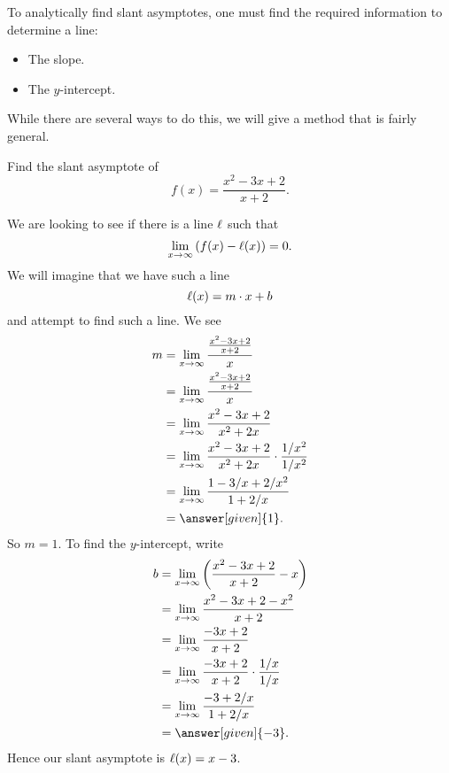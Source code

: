 \documentclass{ximera}
\begin{document}
To analytically find slant asymptotes, one must find the required
information to determine a line:
\begin{itemize}
\item The slope.
\item The $y$-intercept.
\end{itemize}
While there are several ways to do this, we will give a method that is
fairly general.


\begin{example}
  Find the slant asymptote of
  \[
f(x) = \frac{x^2-3x+2}{x+2}.
  \]
  \begin{explanation}
    We are looking to see if there is a line $\ell$ such that
    \[
    \lim_{x\to \infty}\left(f(x) - \l(x)\right) = 0.
    \]
    We will imagine that we have such a line
    \[
    \ell(x) = m\cdot x + b
    \]
    and attempt to find such a line. We see
    \begin{align*}
      m &=\lim_{x\to\infty}\frac{\frac{x^2-3x+2}{x+2}}{x}\\
      &= \lim_{x\to\infty}\frac{\frac{x^2-3x+2}{x+2}}{x}\\
      &= \lim_{x\to\infty}\frac{x^2-3x+2}{x^2+2x}\\
      &= \lim_{x\to\infty}\frac{x^2-3x+2}{x^2+2x}\cdot\frac{1/x^2}{1/x^2}\\
      &= \lim_{x\to\infty}\frac{1-3/x+2/x^2}{1+2/x}\\
      &= \answer[given]{1}.
    \end{align*}
    So $m=1$. To find the $y$-intercept, write
    \begin{align*}
      b &=\lim_{x\to\infty} \left(\frac{x^2-3x+2}{x+2} - x\right)\\
      &=\lim_{x\to\infty} \frac{x^2-3x+2-x^2}{x+2}\\
      &=\lim_{x\to\infty} \frac{-3x+2}{x+2}\\
      &=\lim_{x\to\infty} \frac{-3x+2}{x+2}\cdot\frac{1/x}{1/x}\\
      &=\lim_{x\to\infty} \frac{-3+2/x}{1+2/x}\\
      &= \answer[given]{-3}.
    \end{align*}
    Hence our slant asymptote is $\ell(x) = x-3$.
  \end{explanation}
\end{example}
\end{document}

